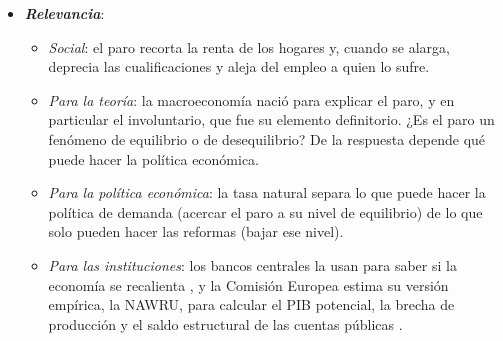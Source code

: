 \documentclass[11pt]{article}
\begin{document}
\begin{itemize}
\item \textbf{\emph{Relevancia}}:
  \begin{itemize}
  \item \emph{Social}: el paro recorta la renta de los hogares y, cuando se alarga, deprecia las cualificaciones y aleja del empleo a quien lo sufre.
  \item \emph{Para la teoría}: la macroeconomía nació para explicar el paro, y en particular el involuntario, que fue su elemento definitorio\nocite{DeVroey2016History}. ¿Es el paro un fenómeno de equilibrio o de desequilibrio? De la respuesta depende qué puede hacer la política económica.
  \item \emph{Para la política económica}: la tasa natural separa lo que puede hacer la política de demanda (acercar el paro a su nivel de equilibrio) de lo que solo pueden hacer las reformas (bajar ese nivel).
  \item \emph{Para las instituciones}: los bancos centrales la usan para saber si la economía se recalienta , y la Comisión Europea estima su versión empírica, la NAWRU, para calcular el PIB potencial, la brecha de producción y el saldo estructural de las cuentas públicas\nocite{Havik2014Potencial} .
  \end{itemize}


\end{itemize}
\end{document}
